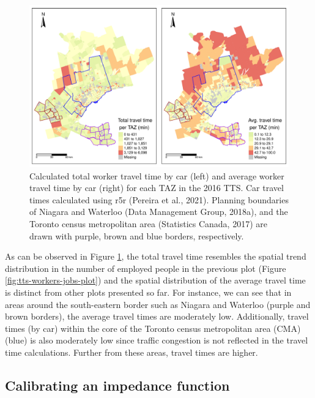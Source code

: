 \documentclass[Royal,times,sageh]{sagej}
\begin{document}
\begin{figure}
\includegraphics[width=1\linewidth]{Manuscript-Data-Package_files/figure-latex/plot-tt-ttpertrip-1} \caption{\label{fig:plot-tt-ttpertrip}Calculated total worker travel time by car (left) and average worker travel time by car (right) for each TAZ in the 2016 TTS. Car travel times calculated using {r5r} (Pereira et al., 2021). Planning boundaries of Niagara and Waterloo (Data Management Group, 2018a), and the Toronto census metropolitan area (Statistics Canada, 2017) are drawn with purple, brown and blue borders, respectively. }\label{fig:plot-tt-ttpertrip}
\end{figure}
\newpage

As can be observed in Figure \ref{fig:plot-tt-ttpertrip}, the total
travel time resembles the spatial trend distribution in the number of
employed people in the previous plot (Figure
\ref{fig:tts-workers-jobs-plot}) and the spatial distribution of the
average travel time is distinct from other plots presented so far. For
instance, we can see that in areas around the south-eastern border such
as Niagara and Waterloo (purple and brown borders), the average travel
times are moderately low. Additionally, travel times (by car) within the
core of the Toronto census metropolitan area (CMA) (blue) is also
moderately low since traffic congestion is not reflected in the travel
time calculations. Further from these areas, travel times are higher.

\hypertarget{calibrating-an-impedance-function}{%
\subsection{Calibrating an impedance
function}\label{calibrating-an-impedance-function}}
\end{document}
